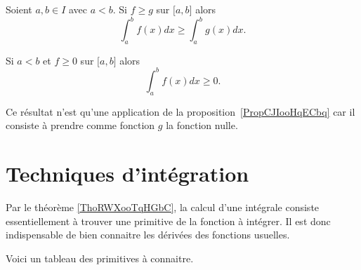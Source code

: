 \begin{proposition}   \label{PropCJIooHqECbq}
	Soient \( a,b\in I\) avec \( a<b\). Si \( f\geq g\) sur \( \mathopen[ a , b \mathclose]\) alors
	\begin{equation}
		\int_a^bf(x)dx\geq \int_a^bg(x)dx.
	\end{equation}
\end{proposition}

\begin{corollary}[Positivité] \label{PropHVWooBDRhCX}
	Si \( a<b\) et \( f\geq 0\) sur \( \mathopen[ a , b \mathclose]\) alors
	\begin{equation}
		\int_a^bf(x)dx\geq 0.
	\end{equation}
\end{corollary}

Ce résultat n'est qu'une application de la proposition~\ref{PropCJIooHqECbq} car il consiste à prendre comme fonction \( g\) la fonction nulle.

\section{Techniques d'intégration}

Par le théorème \ref{ThoRWXooTqHGbC}, la calcul d'une intégrale consiste essentiellement à trouver une primitive de la fonction à intégrer.  Il est donc indispensable de bien connaitre les dérivées des fonctions usuelles.

Voici un tableau des primitives à connaitre.

